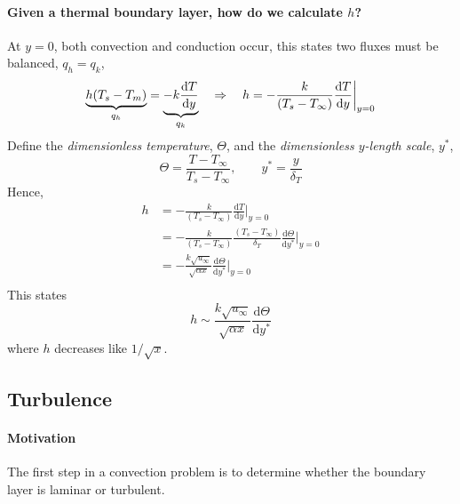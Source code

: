 \documentclass[12pt, a4paper]{article}
\numberwithin{equation}{subsection}
\begin{document}
\paragraph{Given a thermal boundary layer, how do we calculate $h$?} At $y=0$, both convection and conduction occur, this states two fluxes must be balanced, $q_h = q_k$,
\[
    \underbrace{h(T_s-T_m)}_{q_h} = \underbrace{-k\frac{\mathrm{d}T}{\mathrm{d}y}}_{q_k} \quad \Rightarrow \quad
    h = -\frac{k}{(T_s - T_\infty)} \frac{\mathrm{d}T}{\mathrm{d}y} \bigg\lvert_{y=0} \\
\]
Define the \textit{dimensionless temperature}, $\Theta$, and the \textit{dimensionless $y$-length scale}, $y^{*}$,
\[
    \Theta = \frac{T-T_\infty}{T_s-T_\infty}, \quad \quad y^{*} = \frac{y}{\delta_T}
\]
Hence,
\begin{align*}
    h 
    & = -\frac{k}{(T_s - T_\infty)} \frac{\mathrm{d}T}{\mathrm{d}y} \bigg\lvert_{y=0} \\
    & = -\frac{k}{(T_s - T_\infty)} \frac{(T_s - T_\infty)}{\delta_T} \frac{\mathrm{d}\Theta}{\mathrm{d}y^{*}} \bigg\lvert_{y=0}\\
    & = -\frac{k\sqrt{u_\infty}}{\sqrt{\alpha x}} \frac{\mathrm{d}\Theta}{\mathrm{d}y^{*}} \bigg\lvert_{y=0}\\
\end{align*}
This states
\[
    h \sim \frac{k\sqrt{u_\infty}}{\sqrt{\alpha x}} \frac{\mathrm{d}\Theta}{\mathrm{d}y^{*}}
\]
where $h$ decreases like $1/\sqrt{x}$.

\subsection{Turbulence}
\paragraph{Motivation} The first step in a convection problem is to determine whether the boundary layer is laminar or turbulent.
\end{document}
